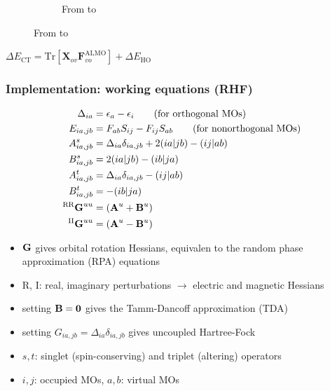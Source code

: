 \documentclass[%
    xcolor=usenames,dvipsnames,svgnames%
]{beamer}
\newenvironment{nscenter}
 {\parskip=0pt\par\nopagebreak\centering}
 {\par\noindent\ignorespacesafterend}
\begin{document}
\begin{frame}
\begin{figure}
\begin{subfigure}[b]{0.50\linewidth}
      \caption*{From  to \ce{[C1C1im]+}}
    \end{subfigure}
  \end{figure}
  \begin{nscenter}
    \(\Delta E_{\text{CT}} = \mathrm{Tr}[\mathbf{X}_{ov}\mathbf{F}_{vo}^{\text{ALMO}}] + \Delta E_{\text{HO}}\)
  \end{nscenter}
\end{frame}

\begin{frame}
  \frametitle{Implementation: working equations (RHF)}
  \begin{align*}
    \Delta_{ia} &= \epsilon_{a} - \epsilon_{i} \tag{for orthogonal MOs}\\
    E_{ia,jb} &= F_{ab}S_{ij} - F_{ij}S_{ab} \tag{for nonorthogonal MOs}\\
    A_{ia,jb}^{s} &= \Delta_{ia}\delta_{ia,jb} + 2(ia|jb) - (ij|ab) \\
    B_{ia,jb}^{s} &= 2(ia|jb) - (ib|ja) \\
    A_{ia,jb}^{t} &= \Delta_{ia}\delta_{ia,jb} - (ij|ab) \\
    B_{ia,jb}^{t} &= - (ib|ja) \\
    ^{\text{RR}}\boldsymbol{\mathbf{G}}^{uu} &= (\boldsymbol{\mathbf{A}}^{u} + \boldsymbol{\mathbf{B}}^{u}) \\
    ^{\text{II}}\boldsymbol{\mathbf{G}}^{uu} &= (\boldsymbol{\mathbf{A}}^{u} - \boldsymbol{\mathbf{B}}^{u})
  \end{align*}
  \scriptsize
  \begin{itemize}
  \item \(\boldsymbol{\mathbf{G}}\) gives orbital rotation Hessians, equivalen to the random phase approximation (RPA) equations \\
  \item R, I: real, imaginary perturbations \(\rightarrow\) electric and magnetic Hessians \\
  \item setting \(\boldsymbol{\mathbf{B}} = \boldsymbol{\mathbf{0}}\) gives the Tamm-Dancoff approximation (TDA) \\
  \item setting \( G_{ia,jb} = \Delta_{ia}\delta_{ia,jb} \) gives uncoupled Hartree-Fock \\
  \item \(s,t\): singlet (spin-conserving) and triplet (altering) operators \\
  \item \(i,j\): occupied MOs, \(a,b\): virtual MOs
  \end{itemize}
\end{frame}
\end{document}
